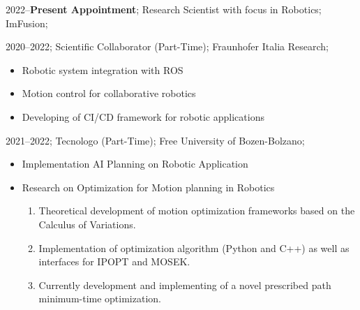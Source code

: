 \addwork%
{%
    2022--\textbf{Present Appointment};%
    Research Scientist with focus in Robotics;%
    ImFusion;%
}%
\addwork%
{%
    2020--2022;%
    Scientific Collaborator (Part-Time);%
    Fraunhofer Italia Research;%
    \begin{itemize}
        \item Robotic system integration with ROS
        \item Motion control for collaborative robotics
        \item Developing of CI/CD framework for robotic applications
    \end{itemize}
}%

\addwork%
{%
    2021--2022;%
    Tecnologo (Part-Time);%
    Free University of Bozen-Bolzano;%
    \begin{itemize}
        \item Implementation AI Planning on Robotic Application
        \item Research on Optimization for Motion planning in Robotics
            \ifdefined\extended
                \begin{enumerate}
                    \item Theoretical development of motion optimization frameworks based on the Calculus of Variations.
                    \item Implementation of optimization algorithm (Python and C++) as well as interfaces for IPOPT and MOSEK.
                    \item Currently development and implementing of a novel prescribed path minimum-time optimization.
                \end{enumerate}
            \fi
    \end{itemize}
}%

